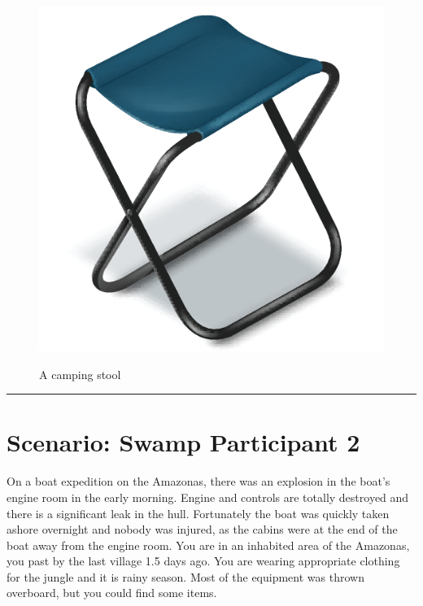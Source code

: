 \documentclass{article}
\begin{document}
    \begin{figure}[H]
        \centering
        \begin{minipage}{0.25\textwidth}
            \centering
            \includegraphics[width=\textwidth]{../SurvivalItemImages/campingstool}
        \end{minipage}\hfill
        \begin{minipage}{0.7\textwidth}
            \centering
            \Large A camping stool
        \end{minipage}
    \end{figure}
    \vspace{-0.8em}
    \noindent\rule{\textwidth}{0.4pt}
            
    \clearpage
    \section*{Scenario: \textmd{Swamp} \hfill Participant \textmd{2}}
    \Large On a boat expedition on the Amazonas, there was an explosion in the boat's engine room in the early morning. Engine and controls are totally destroyed and there is a significant leak in the hull. Fortunately the boat was quickly taken ashore overnight and nobody was injured, as the cabins were at the end of the boat away from the engine room. You are in an inhabited area of the Amazonas, you past by the last village 1.5 days ago. You are wearing appropriate clothing for the jungle and it is rainy season. Most of the equipment was thrown overboard, but you could find some items.\clearpage
        
\end{document}
